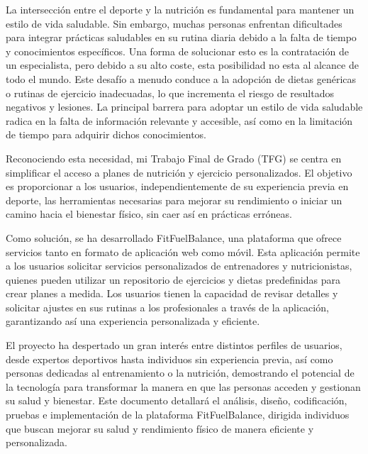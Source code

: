 La intersección entre el deporte y la nutrición es fundamental para mantener un estilo de vida saludable. Sin embargo, muchas personas enfrentan dificultades para integrar prácticas saludables en su rutina diaria debido a la falta de tiempo y conocimientos específicos. Una forma de solucionar esto es la contratación de un especialista, pero debido a su alto coste, esta posibilidad no esta al alcance de todo el mundo. Este desafío a menudo conduce a la adopción de dietas genéricas o rutinas de ejercicio inadecuadas, lo que incrementa el riesgo de resultados negativos y lesiones. La principal barrera para adoptar un estilo de vida saludable radica en la falta de información relevante y accesible, así como en la limitación de tiempo para adquirir dichos conocimientos.

Reconociendo esta necesidad, mi Trabajo Final de Grado (TFG) se centra en simplificar el acceso a planes de nutrición y ejercicio personalizados. El objetivo es proporcionar a los usuarios, independientemente de su experiencia previa en deporte, las herramientas necesarias para mejorar su rendimiento o iniciar un camino hacia el bienestar físico, sin caer así en prácticas erróneas.

Como solución, se ha desarrollado FitFuelBalance, una plataforma que ofrece servicios tanto en formato de aplicación web como móvil. Esta aplicación permite a los usuarios solicitar servicios personalizados de entrenadores y nutricionistas, quienes pueden utilizar un repositorio de ejercicios y dietas predefinidas para crear planes a medida. Los usuarios tienen la capacidad de revisar detalles y solicitar ajustes en sus rutinas a los profesionales a través de la aplicación, garantizando así una experiencia personalizada y eficiente.

El proyecto ha despertado un gran interés entre distintos perfiles de usuarios, desde expertos deportivos hasta individuos sin experiencia previa, así como personas dedicadas al entrenamiento o la nutrición, demostrando el potencial de la tecnología para transformar la manera en que las personas acceden y gestionan su salud y bienestar.
Este documento detallará el análisis, diseño, codificación, pruebas e implementación de la plataforma FitFuelBalance, dirigida individuos que buscan mejorar su salud y rendimiento físico de manera eficiente y personalizada.



